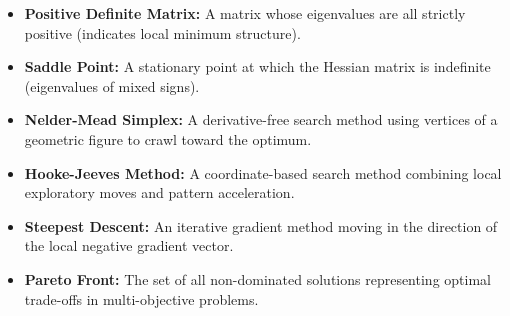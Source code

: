 \documentclass[12pt,a4paper]{article}
\begin{document}
\begin{tcolorbox}[defbox, title={\textbf{One-Line Definitions}}]
\begin{itemize}[leftmargin=*, itemsep=2.5pt, topsep=0pt]
  \item \textbf{Positive Definite Matrix:} A matrix whose eigenvalues are all strictly positive (indicates local minimum structure).
  \item \textbf{Saddle Point:} A stationary point at which the Hessian matrix is indefinite (eigenvalues of mixed signs).
  \item \textbf{Nelder-Mead Simplex:} A derivative-free search method using vertices of a geometric figure to crawl toward the optimum.
  \item \textbf{Hooke-Jeeves Method:} A coordinate-based search method combining local exploratory moves and pattern acceleration.
  \item \textbf{Steepest Descent:} An iterative gradient method moving in the direction of the local negative gradient vector.
  \item \textbf{Pareto Front:} The set of all non-dominated solutions representing optimal trade-offs in multi-objective problems.
\end{itemize}
\end{tcolorbox}
\end{document}

